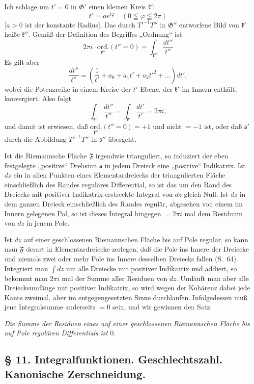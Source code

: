 \documentclass{article}
\begin{document}
Ich schlage um $t' = 0$ in $\mathfrak{G}'$ einen kleinen Kreis $\mathfrak{k}'$:
\[ t' = a e^{i\varphi} \quad (0 \leqq \varphi \leqq 2\pi) \]
[$a > 0$ ist der konstante Radius]. Das durch $T'^{-1} T''$ in $\mathfrak{G}''$ entworfene Bild von $\mathfrak{k}'$ heiße $\mathfrak{k}''$. Gemäß der Definition des Begriffes „Ordnung“ ist
\[ 2\pi i \cdot \underset{\mathfrak{k}''}{\text{ord.}} (t'' = 0) = \int_{\mathfrak{k}''} \frac{dt''}{t''} \]
Es gilt aber
\[ \frac{dt''}{t''} = \left(\frac{1}{t'} + a_0 + a_1 t' + a_2 t'^2 + \dots \right) dt', \]
wobei die Potenzreihe in einem Kreise der $t'$-Ebene, der $\mathfrak{k}'$ im Innern enthält, konvergiert. Also folgt
\[ \int_{\mathfrak{k}''} \frac{dt''}{t''} = \int_{\mathfrak{k}'} \frac{dt'}{t'} = 2\pi i, \]
und damit ist erwiesen, daß $\underset{\mathfrak{k}''}{\text{ord.}} (t'' = 0) = + 1$ und nicht $= - 1$ ist, oder daß $\mathfrak{s}'$ durch die Abbildung $T'^{-1} T''$ in $\mathfrak{s}''$ übergeht.

Ist die Riemannsche Fläche $\mathfrak{F}$ irgendwie trianguliert, so induziert der eben festgelegte „positive“ Drehsinn $\mathfrak{s}$ in jedem Dreieck eine „positive“ Indikatrix. Ist $dz$ ein in allen Punkten eines Elementardreiecks der triangulierten Fläche einschließlich des Randes reguläres Differential, so ist das um den Rand des Dreiecks mit positiver Indikatrix erstreckte Integral von $dz$ gleich Null. Ist $dz$ in dem ganzen Dreieck einschließlich des Randes regulär, abgesehen von einem im Innern gelegenen Pol, so ist dieses Integral hingegen $= 2\pi i$ mal dem Residuum von $dz$ in jenem Pole.

Ist $dz$ auf einer geschlossenen Riemannschen Fläche bis auf Pole regulär, so kann man $\mathfrak{F}$ derart in Elementardreiecke zerlegen, daß die Pole ins Innere der Dreiecke und niemals zwei oder mehr Pole ins Innere desselben Dreiecks fallen (S.~64). Integriert man $\displaystyle\int dz$ um alle Dreiecke mit positiver Indikatrix und addiert, so bekommt man $2\pi i$ mal der Summe aller Residuen von $dz$. Umläuft man aber alle Dreiecksumfänge mit positiver Indikatrix, so wird wegen der Kohärenz dabei jede Kante zweimal, aber im entgegengesetzten Sinne durchlaufen. Infolgedessen muß jene Integralsumme anderseits $= 0$ sein, und wir gewinnen den Satz:

\emph{Die Summe der Residuen eines auf einer geschlossenen Riemannschen Fläche bis auf Pole regulären Differentials ist $0$.}

\subsection*{§ 11. Integralfunktionen. Geschlechtszahl. Kanonische Zerschneidung.}
\end{document}
